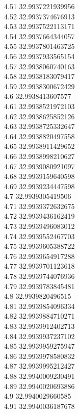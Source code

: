 {4.51	32.9937221939956\\
4.52	32.9937374676913\\
4.53	32.9937522113171\\
4.54	32.9937664344057\\
4.55	32.9937801463725\\
4.56	32.9937933565154\\
4.57	32.9938060740163\\
4.58	32.9938183079417\\
4.59	32.9938300672429\\
4.6	32.9938413607577\\
4.61	32.9938521972103\\
4.62	32.9938625852126\\
4.63	32.9938725332647\\
4.64	32.9938820497558\\
4.65	32.9938911429652\\
4.66	32.9938998210627\\
4.67	32.9939080921097\\
4.68	32.9939159640598\\
4.69	32.9939234447598\\
4.7	32.9939305419506\\
4.71	32.9939372632675\\
4.72	32.9939436162419\\
4.73	32.9939496083012\\
4.74	32.9939552467703\\
4.75	32.9939605388722\\
4.76	32.9939654917288\\
4.77	32.9939701123618\\
4.78	32.9939744076936\\
4.79	32.9939783845481\\
4.8	32.9939820496515\\
4.81	32.9939854096334\\
4.82	32.9939884710271\\
4.83	32.9939912402713\\
4.84	32.9939937237102\\
4.85	32.9939959275947\\
4.86	32.9939978580832\\
4.87	32.9939995212427\\
4.88	32.9940009230491\\
4.89	32.9940020693886\\
4.9	32.9940029660585\\
4.91	32.9940036187678\\
}

